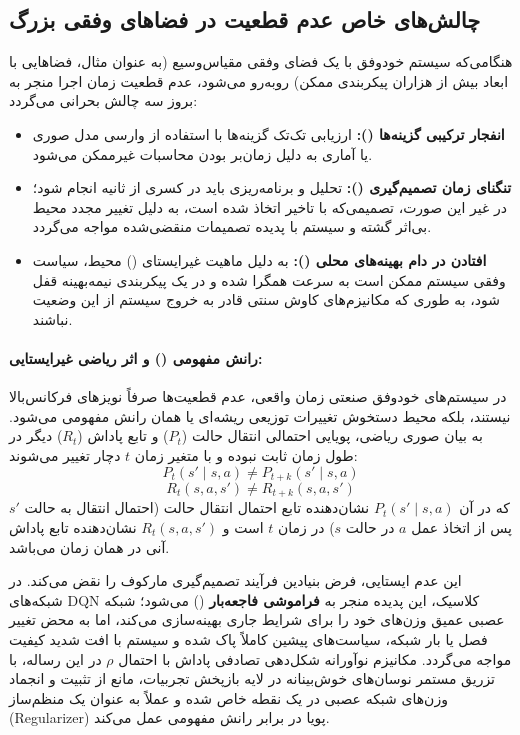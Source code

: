 \documentclass[oneside,openany,phd]{TMU-Thesis}
\begin{document}
\subsection{چالش‌های خاص عدم قطعیت در فضاهای وفقی بزرگ}

هنگامی‌که سیستم خودوفق با یک فضای وفقی مقیاس‌وسیع (به عنوان مثال، فضاهایی با ابعاد بیش از هزاران پیکربندی ممکن) روبه‌رو می‌شود، عدم قطعیت زمان اجرا منجر به بروز سه چالش بحرانی می‌گردد:
\begin{itemize}
    \item \textbf{انفجار ترکیبی گزینه‌ها ():} ارزیابی تک‌تک گزینه‌ها با استفاده از وارسی مدل صوری یا آماری به دلیل زمان‌بر بودن محاسبات غیرممکن می‌شود.
    \item \textbf{تنگنای زمان تصمیم‌گیری ():} تحلیل و برنامه‌ریزی باید در کسری از ثانیه انجام شود؛ در غیر این صورت، تصمیمی‌که با تاخیر اتخاذ شده است، به دلیل تغییر مجدد محیط بی‌اثر گشته و سیستم با پدیده تصمیمات منقضی‌شده مواجه می‌گردد.
    \item \textbf{افتادن در دام بهینه‌های محلی ():} به دلیل ماهیت غیرایستای () محیط، سیاست وفقی سیستم ممکن است به سرعت همگرا شده و در یک پیکربندی نیمه‌بهینه قفل شود، به طوری که مکانیزم‌های کاوش سنتی قادر به خروج سیستم از این وضعیت نباشند.
\end{itemize}

\paragraph{رانش مفهومی () و اثر ریاضی غیرایستایی:}
در سیستم‌های خودوفق صنعتی زمان واقعی، عدم قطعیت‌ها صرفاً نویزهای فرکانس‌بالا نیستند، بلکه محیط دستخوش تغییرات توزیعی ریشه‌ای یا همان رانش مفهومی می‌شود. به بیان صوری ریاضی، پویایی احتمالی انتقال حالت ($P_t$) و تابع پاداش ($R_t$) دیگر در طول زمان ثابت نبوده و با متغیر زمان $t$ دچار تغییر می‌شوند:
$$P_t(s' \mid s, a) \neq P_{t+k}(s' \mid s, a)$$
$$R_t(s, a, s') \neq R_{t+k}(s, a, s')$$
که در آن $P_t(s' \mid s, a)$ نشان‌دهنده تابع احتمال انتقال حالت (احتمال انتقال به حالت $s'$ پس از اتخاذ عمل $a$ در حالت $s$) در زمان $t$ است و $R_t(s, a, s')$ نشان‌دهنده تابع پاداش آنی در همان زمان می‌باشد.

این عدم ایستایی، فرض بنیادین فرآیند تصمیم‌گیری مارکوف را نقض می‌کند. در شبکه‌های DQN کلاسیک، این پدیده منجر به \textbf{فراموشی فاجعه‌بار} () می‌شود؛ شبکه عصبی عمیق وزن‌های خود را برای شرایط جاری بهینه‌سازی می‌کند، اما به محض تغییر فصل یا بار شبکه، سیاست‌های پیشین کاملاً پاک شده و سیستم با افت شدید کیفیت مواجه می‌گردد. مکانیزم نوآورانه شکل‌دهی تصادفی پاداش با احتمال $\rho$ در این رساله، با تزریق مستمر نوسان‌های خوش‌بینانه در لایه بازپخش تجربیات، مانع از تثبیت و انجماد وزن‌های شبکه عصبی در یک نقطه خاص شده و عملاً به عنوان یک منظم‌ساز (Regularizer) پویا در برابر رانش مفهومی عمل می‌کند.
\end{document}
